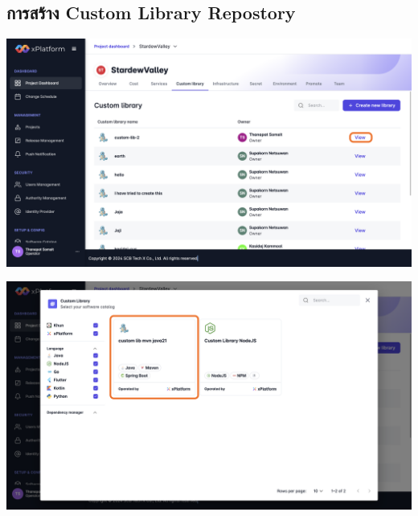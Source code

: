 \subsection{การสร้าง Custom Library Repostory}
\begin{center}
    \includegraphics[width=\linewidth]{resources/pages/custom-library/create-library/1.png}

    \vspace{1in}

    \includegraphics[width=\linewidth]{resources/pages/custom-library/create-library/2.png}
\end{center}
